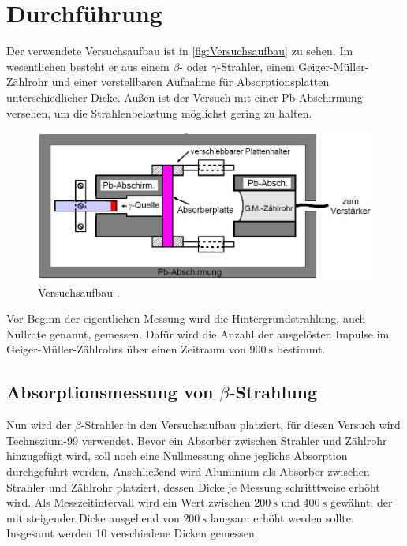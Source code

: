 \section{Durchführung}
\label{sec:Durchführung}

Der verwendete Versuchsaufbau ist in \autoref{fig:Versuchsaufbau} zu sehen.
Im wesentlichen besteht er aus einem $\beta$- oder $\gamma$-Strahler, einem
Geiger-Müller-Zählrohr und einer verstellbaren Aufnahme für Absorptionsplatten unterschiedlicher
Dicke. Außen ist der Versuch mit einer Pb-Abschirmung versehen, um die Strahlenbelastung möglichst
gering zu halten.
\begin{figure}[H]
    \centering
    \includegraphics[height=5cm]{content/pics/versuch.jpg}
    \caption{Versuchsaufbau \cite{v704}.}
    \label{fig:Versuchsaufbau}
\end{figure}
Vor Beginn der eigentlichen Messung wird die Hintergrundstrahlung, auch Nullrate genannt, gemessen.
Dafür wird die Anzahl der ausgelösten Impulse im Geiger-Müller-Zählrohrs über einen Zeitraum von $\qty{900}{\second}$
bestimmt.

\subsection{\texorpdfstring{Absorptionsmessung von $\beta$-Strahlung}{Absorptionsmessung von Beta-Strahlung}}
\label{sec:seggs}
Nun wird der $\beta$-Strahler in den Versuchsaufbau platziert, für diesen Versuch wird Technezium-99 verwendet.
Bevor ein Absorber zwischen Strahler und Zählrohr hinzugefügt wird, soll noch eine Nullmessung ohne jegliche
Absorption durchgeführt werden.
Anschließend wird Aluminium als Absorber zwischen Strahler und Zählrohr platziert, dessen Dicke
je Messung schritttweise erhöht wird.
Als Messzeitintervall wird ein Wert zwischen $\qty{200}{\second}$ und $\qty{400}{\second}$ gewähnt, der 
mit steigender Dicke ausgehend von $\qty{200}{\second}$ langsam erhöht werden sollte.
Insgesamt werden 10 verschiedene Dicken gemessen.

